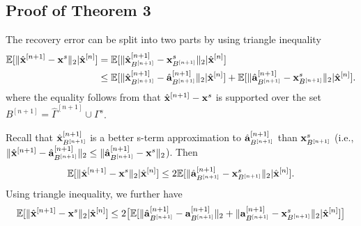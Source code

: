\documentclass{article}
\newtheorem{proof}{Proof}
\begin{document}



\subsection{Proof of Theorem 3}
The recovery error can be split into two parts by using triangle inequality
\begin{equation}\label{main_theorem}
\begin{split}
   \mathbb{E}[ \|\hat{{\bf x}}^{[n+1]} - {\bf x}^s \|_2 | \hat{{\bf x}}^{[n]}] &= \mathbb{E}[\|\hat{{\bf x}}_{B^{[n+1]}}^{[n+1]} - {\bf x}_{B^{[n+1]}}^s \|_2| \hat{{\bf x}}^{[n]}] \\
    &\leq \mathbb{E}[\|\hat{{\bf x}}_{B^{[n+1]}}^{[n+1]} - \hat{{\bf a}}_{B^{[n+1]}}^{[n+1]} \|_2| \hat{{\bf x}}^{[n]}] + \mathbb{E}[\|\hat{{\bf a}}_{B^{[n+1]}}^{[n+1]} - {\bf x}_{B^{[n+1]}}^s \|_2| \hat{{\bf x}}^{[n]}].
    \end{split}
\end{equation}
where the equality follows from that $\hat{{\bf x}}^{[n+1]} - {\bf x}^s$ is supported over the set $B^{[n+1]} = \hat{\Gamma}^{[n+1]} \cup \Gamma^s$.

Recall that $\hat{{\bf x}}_{B^{[n+1]}}^{[n+1]}$ is a better s-term approximation to $\hat{{\bf a}}_{B^{[n+1]}}^{[n+1]}$ than ${\bf x}_{B^{[n+1]}}^{s}$ \big(i.e., $\|\hat{{\bf x}}^{[n+1]} - \hat{{\bf a}}_{B^{[n+1]}}^{[n+1]} \|_2\leq \| \hat{{\bf a}}_{B^{[n+1]}}^{[n+1]} - {\bf x}^s \|_2$\big). Then 
\begin{equation}
    \mathbb{E}[\|\hat{{\bf x}}^{[n+1]} - {\bf x}^s \|_2| \hat{{\bf x}}^{[n]}] \leq 2\mathbb{E}[ \|\hat{{\bf a}}_{B^{[n+1]}}^{[n+1]} - {\bf x}_{B^{[n+1]}}^s \|_2 | \hat{{\bf x}}^{[n]}].
\end{equation}
Using triangle inequality, we further have
\begin{equation}\label{nonproof_bound_final}
    \mathbb{E}[\|\hat{{\bf x}}^{[n+1]} - {\bf x}^s \|_2| \hat{{\bf x}}^{[n]}]\leq 2 \big [\mathbb{E}[\|\hat{{\bf a}}_{B^{[n+1]}}^{[n+1]} - {{\bf a}}_{B^{[n+1]}}^{[n+1]} \|_2  + \|{{\bf a}}_{B^{[n+1]}}^{[n+1]} - {{\bf x}}_{B^{[n+1]}}^{s} \|_2 | \hat{{\bf x}}^{[n]}]\big ]
\end{equation}
\end{document}
